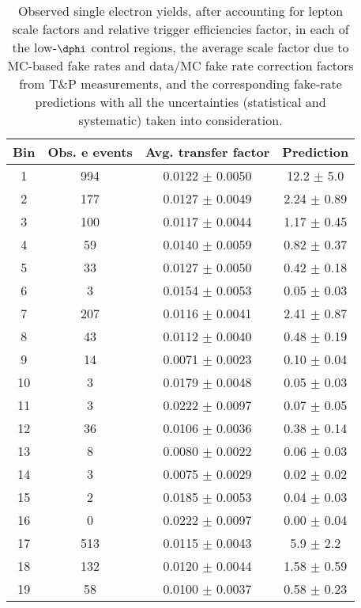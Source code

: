 \begin{table}
\centering
\caption[Fake rate predictions in low \dphi]{Observed single electron yields, after accounting for lepton scale factors
and relative trigger efficiencies factor, in each of the low-$\dphi$ control regions, the 
average scale factor due to MC-based fake rates and data/MC fake rate correction
factors from T\&P measurements, and the corresponding fake-rate predictions with all the uncertainties (statistical and systematic) taken into consideration.}
\label{tab:fakeRatePredictions_LDP}
\begin{tabular}{c|c|c|c}
Bin & Obs. e events & Avg. transfer factor  & Prediction \\ \hline\hline
1 & 994  & 0.0122  $\pm$  0.0050  & 12.2 $\pm$ 5.0    \\\hline
2 & 177  & 0.0127  $\pm$  0.0049  & 2.24 $\pm$ 0.89    \\\hline
3 & 100  & 0.0117  $\pm$  0.0044  & 1.17 $\pm$ 0.45    \\\hline
4 & 59  & 0.0140  $\pm$  0.0059  & 0.82 $\pm$ 0.37    \\\hline
5 & 33  & 0.0127  $\pm$  0.0050  & 0.42 $\pm$ 0.18    \\\hline
6 & 3  & 0.0154  $\pm$  0.0053  & 0.05 $\pm$ 0.03    \\\hline
7 & 207  & 0.0116  $\pm$  0.0041  & 2.41 $\pm$ 0.87    \\\hline
8 & 43  & 0.0112  $\pm$  0.0040  & 0.48 $\pm$ 0.19    \\\hline
9 & 14  & 0.0071  $\pm$  0.0023  & 0.10 $\pm$ 0.04    \\\hline
10 & 3  & 0.0179  $\pm$  0.0048  & 0.05 $\pm$ 0.03    \\\hline
11 & 3  & 0.0222  $\pm$  0.0097  & 0.07 $\pm$ 0.05    \\\hline
12 & 36  & 0.0106  $\pm$  0.0036  & 0.38 $\pm$ 0.14    \\\hline
13 & 8  & 0.0080  $\pm$  0.0022  & 0.06 $\pm$ 0.03    \\\hline
14 & 3  & 0.0075  $\pm$  0.0029  & 0.02 $\pm$ 0.02    \\\hline
15 & 2  & 0.0185  $\pm$  0.0053  & 0.04 $\pm$ 0.03    \\\hline
16 & 0  & 0.0222  $\pm$  0.0097  & 0.00 $\pm$ 0.04    \\\hline
17 & 513  & 0.0115  $\pm$  0.0043  & 5.9 $\pm$ 2.2    \\\hline
18 & 132  & 0.0120  $\pm$  0.0044  & 1.58 $\pm$ 0.59    \\\hline
19 & 58  & 0.0100  $\pm$  0.0037  & 0.58 $\pm$ 0.23    \\\hline

\end{tabular}
\end{table}
